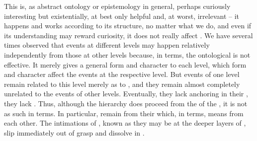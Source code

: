 This  is, as abstract ontology or epistemology in general, perhaps
curiously interesting but existentially, at best only helpful and, at worst,
irrelevant -- it happens and works according to its structure, no matter what we
do, and even if its understanding may reward  curiosity, it does not
really affect .  We have several times observed that events at different
levels may happen relatively independently from those at other levels because,
in  terms, the ontological  is not effective.  It
merely gives a general form and character to each level, which form and
character affect the events at the respective level. But events of one level
remain related to this level merely as  to , and they
remain almost completely unrelated to the events of other levels. Eventually,
they lack anchoring in their , they lack .
Thus, although the hierarchy does proceed from the  of the ,
it is not  as such in  terms.  In particular,
 remain  from their  which, in
 terms, means from each other.  The intimations of ,
 known as they may be at the deeper layers of , slip
immediately out of   grasp and dissolve in
.

